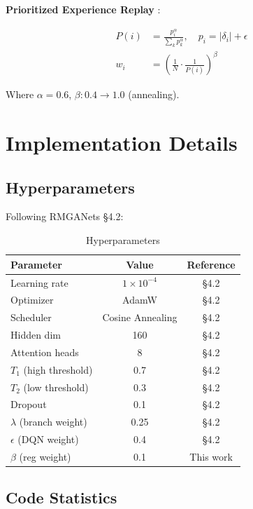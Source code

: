 \documentclass[11pt,a4paper]{article}
\begin{document}
\textbf{Prioritized Experience Replay} \cite{schaul2016prioritized}:

\begin{align}
P(i) &= \frac{p_i^\alpha}{\sum_k p_k^\alpha}, \quad p_i = |\delta_i| + \epsilon \\
w_i &= \left(\frac{1}{N} \cdot \frac{1}{P(i)}\right)^\beta
\end{align}

Where $\alpha=0.6$, $\beta: 0.4 \rightarrow 1.0$ (annealing).

\section{Implementation Details}

\subsection{Hyperparameters}

Following RMGANets §4.2:

\begin{table}[htbp]
\centering
\caption{Hyperparameters}
\begin{tabular}{@{}lcc@{}}
\toprule
\textbf{Parameter} & \textbf{Value} & \textbf{Reference} \\
\midrule
Learning rate & $1 \times 10^{-4}$ & §4.2 \\
Optimizer & AdamW & §4.2 \\
Scheduler & Cosine Annealing & §4.2 \\
Hidden dim & 160 & §4.2 \\
Attention heads & 8 & §4.2 \\
$T_1$ (high threshold) & 0.7 & §4.2 \\
$T_2$ (low threshold) & 0.3 & §4.2 \\
Dropout & 0.1 & §4.2 \\
$\lambda$ (branch weight) & 0.25 & §4.2 \\
$\epsilon$ (DQN weight) & 0.4 & §4.2 \\
$\beta$ (reg weight) & 0.1 & This work \\
\bottomrule
\end{tabular}
\end{table}

\subsection{Code Statistics}
\end{document}
